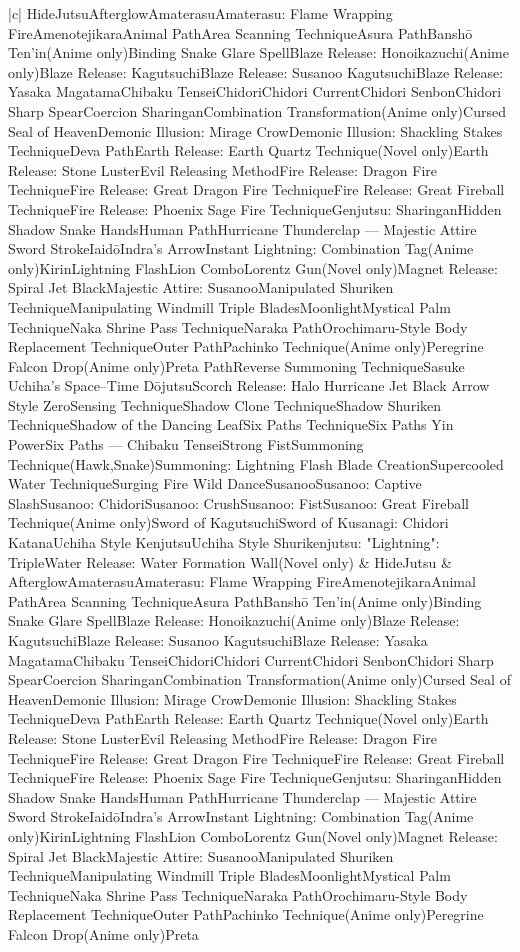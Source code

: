 \documentclass[a4paper,12pt]{article}
\begin{document}
\begin{tabular}{|c|}
HideJutsuAfterglowAmaterasuAmaterasu: Flame Wrapping FireAmenotejikaraAnimal PathArea Scanning TechniqueAsura PathBanshō Ten'in(Anime only)Binding Snake Glare SpellBlaze Release: Honoikazuchi(Anime only)Blaze Release: KagutsuchiBlaze Release: Susanoo KagutsuchiBlaze Release: Yasaka MagatamaChibaku TenseiChidoriChidori CurrentChidori SenbonChidori Sharp SpearCoercion SharinganCombination Transformation(Anime only)Cursed Seal of HeavenDemonic Illusion: Mirage CrowDemonic Illusion: Shackling Stakes TechniqueDeva PathEarth Release: Earth Quartz Technique(Novel only)Earth Release: Stone LusterEvil Releasing MethodFire Release: Dragon Fire TechniqueFire Release: Great Dragon Fire TechniqueFire Release: Great Fireball TechniqueFire Release: Phoenix Sage Fire TechniqueGenjutsu: SharinganHidden Shadow Snake HandsHuman PathHurricane Thunderclap — Majestic Attire Sword StrokeIaidōIndra's ArrowInstant Lightning: Combination Tag(Anime only)KirinLightning FlashLion ComboLorentz Gun(Novel only)Magnet Release: Spiral Jet BlackMajestic Attire: SusanooManipulated Shuriken TechniqueManipulating Windmill Triple BladesMoonlightMystical Palm TechniqueNaka Shrine Pass TechniqueNaraka PathOrochimaru-Style Body Replacement TechniqueOuter PathPachinko Technique(Anime only)Peregrine Falcon Drop(Anime only)Preta PathReverse Summoning TechniqueSasuke Uchiha's Space–Time DōjutsuScorch Release: Halo Hurricane Jet Black Arrow Style ZeroSensing TechniqueShadow Clone TechniqueShadow Shuriken TechniqueShadow of the Dancing LeafSix Paths TechniqueSix Paths Yin PowerSix Paths — Chibaku TenseiStrong FistSummoning Technique(Hawk,Snake)Summoning: Lightning Flash Blade CreationSupercooled Water TechniqueSurging Fire Wild DanceSusanooSusanoo: Captive SlashSusanoo: ChidoriSusanoo: CrushSusanoo: FistSusanoo: Great Fireball Technique(Anime only)Sword of KagutsuchiSword of Kusanagi: Chidori KatanaUchiha Style KenjutsuUchiha Style Shurikenjutsu: "Lightning": TripleWater Release: Water Formation Wall(Novel only) & HideJutsu & AfterglowAmaterasuAmaterasu: Flame Wrapping FireAmenotejikaraAnimal PathArea Scanning TechniqueAsura PathBanshō Ten'in(Anime only)Binding Snake Glare SpellBlaze Release: Honoikazuchi(Anime only)Blaze Release: KagutsuchiBlaze Release: Susanoo KagutsuchiBlaze Release: Yasaka MagatamaChibaku TenseiChidoriChidori CurrentChidori SenbonChidori Sharp SpearCoercion SharinganCombination Transformation(Anime only)Cursed Seal of HeavenDemonic Illusion: Mirage CrowDemonic Illusion: Shackling Stakes TechniqueDeva PathEarth Release: Earth Quartz Technique(Novel only)Earth Release: Stone LusterEvil Releasing MethodFire Release: Dragon Fire TechniqueFire Release: Great Dragon Fire TechniqueFire Release: Great Fireball TechniqueFire Release: Phoenix Sage Fire TechniqueGenjutsu: SharinganHidden Shadow Snake HandsHuman PathHurricane Thunderclap — Majestic Attire Sword StrokeIaidōIndra's ArrowInstant Lightning: Combination Tag(Anime only)KirinLightning FlashLion ComboLorentz Gun(Novel only)Magnet Release: Spiral Jet BlackMajestic Attire: SusanooManipulated Shuriken TechniqueManipulating Windmill Triple BladesMoonlightMystical Palm TechniqueNaka Shrine Pass TechniqueNaraka PathOrochimaru-Style Body Replacement TechniqueOuter PathPachinko Technique(Anime only)Peregrine Falcon Drop(Anime only)Preta 
\end{tabular}
\end{document}

